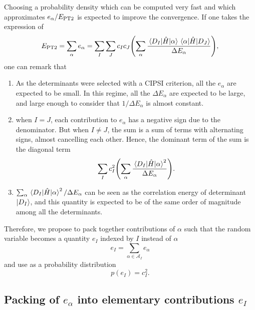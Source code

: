 \documentclass[./thesis.tex]{subfiles}
\begin{document}
Choosing a probability density which can be computed very fast and which
approximates $e_\alpha / E_\text{PT2}$ is expected to improve the convergence.
If one takes the expression of 
\begin{equation}
E_\text{PT2} = \sum_\alpha e_\alpha = 
\sum_I \sum_J c_I c_J \qty( \sum_\alpha \frac{\mel{D_I}{\hat{H}}{\alpha} \mel{\alpha}{\hat{H}}{D_J}}{\Delta E_\alpha}), 
\end{equation}
one can remark that
\begin{enumerate}
\item As the determinants were selected with a CIPSI criterion, all the $e_\alpha$ are expected to be small. In this regime, all the $\Delta E_\alpha$ are expected to be large, and large enough to consider that $1/\Delta E_\alpha$ is almost constant.
\item 
when $I=J$, each contribution to $e_\alpha$ has a negative sign due to the denominator. But when $I \ne J$, the sum is a sum of terms with alternating signs, almost cancelling each other. Hence, the dominant term of the sum is the diagonal term
\begin{equation}
\sum_I c_I^2 \qty( \sum_\alpha \frac{\mel{D_I}{\hat{H}}{\alpha}^2 }{\Delta E_\alpha}). 
\end{equation}
\item $\sum_\alpha \mel{D_I}{\hat{H}}{\alpha}^2 / \Delta E_\alpha$ can be seen as the correlation
energy of determinant ${\ket{D_I}}$, and this quantity is expected to be of the same order of magnitude among all the determinants. 
\end{enumerate}
Therefore, we propose to pack together contributions of $\alpha$ such that the random variable becomes 
a quantity $e_I$ indexed by $I$ instead of $\alpha$
\begin{equation}
e_I = \sum_{\alpha \in \mathcal{A}_I} e_\alpha
\label{eq:ei_to_alpha}
\end{equation}
and use as a probability distribution
\begin{equation}
p(e_I) = {c_I^2}.
\end{equation}

\subsection{Packing of $e_\alpha$ into elementary contributions $e_I$}
\end{document}
